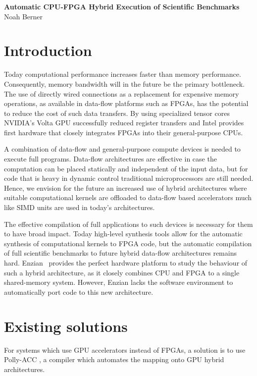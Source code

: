\documentclass[12pt]{article}
\begin{document}
\begingroup  
  \centering
  \LARGE \textbf{
Automatic CPU-FPGA Hybrid Execution of
Scientific Benchmarks
}\\
  \large Noah Berner\par
\endgroup

\section*{Introduction}
Today computational performance increases faster than memory performance.
Consequently, memory bandwidth will in the future be the primary bottleneck.
The use of directly wired connections as a replacement for expensive memory
operations, as available in data-flow platforms such as FPGAs, has the
potential to reduce the cost of such data transfers. By using specialized
tensor cores NVIDIA's Volta GPU successfully reduced register transfers
and Intel provides first hardware that closely integrates FPGAs into their
general-purpose CPUs.

A combination of data-flow and general-purpose compute devices is needed to
execute full programs. Data-flow architectures are effective in case the
computation can be placed statically and independent of the input data, but
for code that is heavy in dynamic control traditional microprocessors are still
needed. Hence, we envision for the future an increased use of hybrid
architectures where suitable computational kernels are offloaded to data-flow
based accelerators much like SIMD units are used in today's architectures.

The effective compilation of full applications to such devices is necessary
for them to have broad impact. Today high-level synthesis tools allow for
the automatic synthesis of computational kernels to FPGA code, but the
automatic compilation of full scientific benchmarks to future hybrid
data-flow architectures remains hard. Enzian~\cite{Enzian} provides the
perfect hardware platform to study the behaviour of such a hybrid architecture, as
it closely combines CPU and FPGA to a single shared-memory system. However,
Enzian lacks the software environment to automatically port code to this new
architecture.
\section*{Existing solutions}
For systems which use GPU accelerators instead of FPGAs, a solution is to use Polly-ACC \cite{Polly_ACC}, a compiler which automates the mapping onto GPU hybrid architectures.
\end{document}

